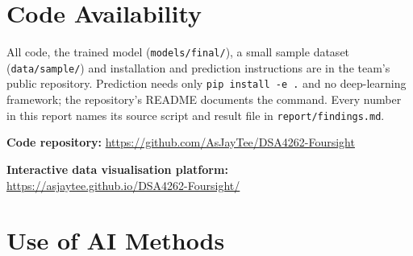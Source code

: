 \documentclass[11pt,a4paper]{article}
\begin{document}
\section*{Code Availability}

All code, the trained model (\texttt{models/final/}), a small sample dataset
(\texttt{data/sample/}) and installation and prediction instructions are in
the team's public repository. Prediction needs only \texttt{pip install -e .}
and no deep-learning framework; the repository's README documents the
command. Every number in this report names its source script and result file
in \texttt{report/findings.md}.

\noindent\textbf{Code repository:} \url{https://github.com/AsJayTee/DSA4262-Foursight}

\noindent\textbf{Interactive data visualisation platform:}\\ \url{https://asjaytee.github.io/DSA4262-Foursight/}
\section*{Use of AI Methods}
\end{document}
